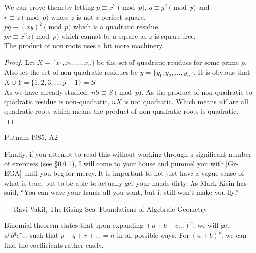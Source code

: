 We can prove them by letting $p\equiv x^2 \pmod{p}$, $q\equiv y^2 \pmod{p}$ and $r\equiv z \pmod{p}$ where $z$ is not a perfect square.\\
$pq \equiv (xy)^2 \pmod{p}$ which is a quadratic residue.\\
$pr\equiv x^2z \pmod{p}$ which cannot be a square as $z$ is square free.\\
The product of non roots uses a bit more machinery.\\
\begin{proof}
   Let $X = \{x_1, x_2, \dots , x_n\}$ be the set of quadratic residues for some prime $p$. Also let the set of non quadratic residues be $y = \{y_1, y_2, \dots , y_n\}$. It is obvious that $X \cup Y = \{1, 2, 3, \dots , p - 1\} = S$,\\
   As we have already studied, $nS \equiv S \pmod{p}$.  As the product of non-quadratic to quadratic residue is non-quadratic, $nX$ is not quadratic. Which means $nY$ are all quadratic roots which means the product of non-quadratic roots is quadratic.\\
\end{proof}



Putnam 1985, A2

Finally, if you attempt to read this without working through a significant number of exercises (see §0.0.1), I will come to your house and pummel you with [Gr-EGA] until you beg for mercy. It is important to not just have a vague sense of what is true, but to be able to actually get your hands dirty. As Mark Kisin has said, “You can wave your hands all you want, but it still won’t make you fly.”

— Ravi Vakil, The Rising Sea: Foundations of Algebraic Geometry


Binomial theorem states that upon expanding $(a+b+c \dots)^n$, we will get $a^p b^q c^r \dots$ such that $p+q+r + \dots =n$ in all possible ways. For $(a+b)^n$, we can find the coefficients rather easily.